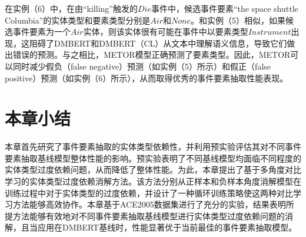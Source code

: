 在实例（6）中，在由“killing”触发的$Die$事件中，候选事件要素“the space shuttle Columbia”的实体类型和要素类型分别是$Air$和$None$。和实例（5）相似，如果候选事件要素为一个$Air$实体，则该实体很有可能在事件中以要素类型$Instrument$出现，这阻碍了DMBERT和DMBERT（CL）从文本中理解语义信息，导致它们做出错误的预测。与之相比，METOR模型正确预测了要素类型。因此，METOR可以同时减少假负（false negative）预测（如实例（5）所示）和假正（false positive）预测（如实例（6）所示），从而取得优秀的事件要素抽取性能表现。

\section{本章小结}
本章首先研究了事件要素抽取的实体类型依赖性，并利用预实验评估其对不同事件要素抽取基线模型整体性能的影响。预实验表明了不同基线模型均面临不同程度的实体类型过度依赖问题，从而降低了整体性能。为此，本章提出了基于多角度对比学习的实体类型过度依赖消解方法。该方法分别从正样本和负样本角度消解模型在训练过程中对于实体类型的过度依赖，并设计了一种循环训练策略使这两种对比学习方法能够高效协作。本章基于ACE2005数据集进行了充分的实验，结果表明所提方法能够有效地对不同事件要素抽取基线模型进行实体类型过度依赖问题的消解，且当应用在DMBERT基线时，性能显著优于当前最佳的事件要素抽取模型。
